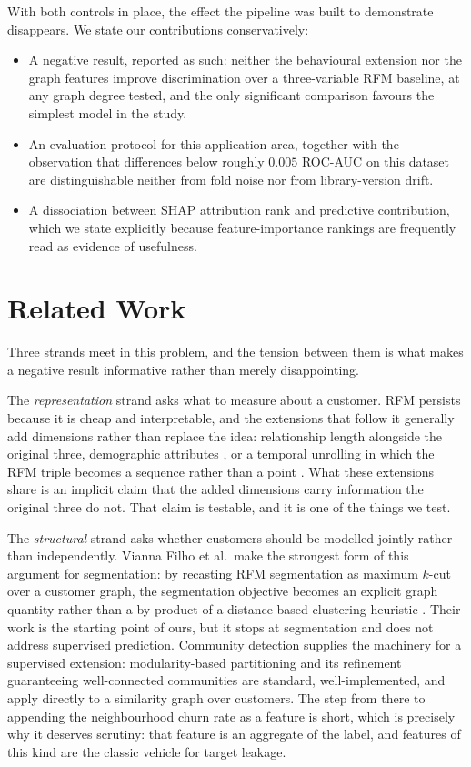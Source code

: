 \documentclass[runningheads]{llncs}
\begin{document}
With both controls in place, the effect the pipeline was built to demonstrate
disappears. We state our contributions conservatively:

\begin{itemize}
\item A negative result, reported as such: neither the behavioural extension nor
the graph features improve discrimination over a three-variable RFM baseline, at
any graph degree tested, and the only significant comparison favours the simplest
model in the study.
\item An evaluation protocol for this application area, together with the
observation that differences below roughly $0.005$ ROC-AUC on this dataset are
distinguishable neither from fold noise nor from library-version drift.
\item A dissociation between SHAP attribution rank and predictive contribution,
which we state explicitly because feature-importance rankings are frequently read
as evidence of usefulness.
\end{itemize}

\section{Related Work}

Three strands meet in this problem, and the tension between them is what makes a
negative result informative rather than merely disappointing.

The \emph{representation} strand asks what to measure about a customer. RFM
persists because it is cheap and interpretable, and the extensions that follow it
generally add dimensions rather than replace the idea: relationship length
alongside the original three, demographic attributes \cite{ho2023extended}, or a
temporal unrolling in which the RFM triple becomes a sequence rather than a point
\cite{mena2023timevarying}. What these extensions share is an implicit claim that
the added dimensions carry information the original three do not. That claim is
testable, and it is one of the things we test.

The \emph{structural} strand asks whether customers should be modelled jointly
rather than independently. Vianna Filho et al.\ make the strongest form of this
argument for segmentation: by recasting RFM segmentation as maximum $k$-cut over
a customer graph, the segmentation objective becomes an explicit graph quantity
rather than a by-product of a distance-based clustering heuristic
\cite{viannafilho2026rfm}. Their work is the starting point of ours, but it stops
at segmentation and does not address supervised prediction. Community detection
supplies the machinery for a supervised extension: modularity-based partitioning
\cite{newman2004community,blondel2008louvain} and its refinement guaranteeing
well-connected communities \cite{traag2019leiden} are standard, well-implemented,
and apply directly to a similarity graph over customers. The step from there to
appending the neighbourhood churn rate as a feature is short, which is precisely
why it deserves scrutiny: that feature is an aggregate of the label, and features
of this kind are the classic vehicle for target leakage.
\end{document}
